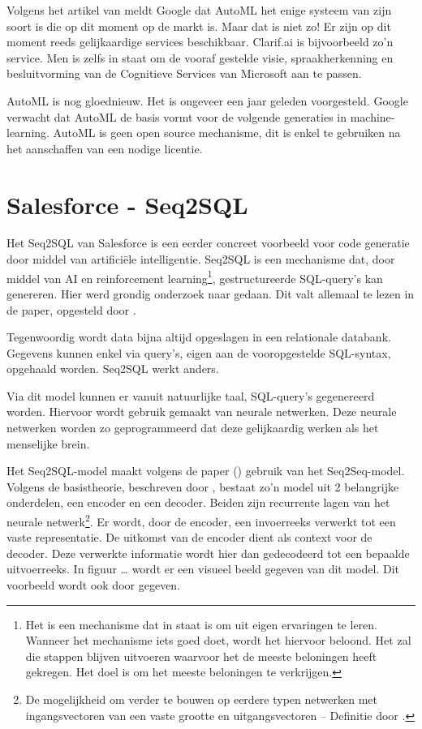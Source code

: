 Volgens het artikel van \textcite{tc} meldt Google dat AutoML het enige systeem van zijn soort is die op dit moment op de markt is. Maar dat is niet zo! Er zijn op dit moment reeds gelijkaardige services beschikbaar. Clarif.ai is bijvoorbeeld zo’n service. Men is zelfs in staat om de vooraf gestelde visie, spraakherkenning en besluitvorming van de Cognitieve Services van Microsoft aan te passen.
 
AutoML is nog gloednieuw. Het is ongeveer een jaar geleden voorgesteld. Google verwacht dat AutoML de basis vormt voor de volgende generaties in machine-learning. AutoML is geen open source mechanisme, dit is enkel te gebruiken na het aanschaffen van een nodige licentie.

\section{Salesforce - Seq2SQL}
\label{sec:Salesforce - Seq2SQL}

Het Seq2SQL van Salesforce is een eerder concreet voorbeeld voor code generatie door middel van artificiële intelligentie. Seq2SQL is een mechanisme dat, door middel van AI en reinforcement learning\footnote{Het is een mechanisme dat in staat is om uit eigen ervaringen te leren. Wanneer het mechanisme iets goed doet, wordt het hiervoor beloond. Het zal die stappen blijven uitvoeren waarvoor het de meeste beloningen heeft gekregen. Het doel is om het meeste beloningen te verkrijgen.}, gestructureerde SQL-query’s kan genereren. Hier werd grondig onderzoek naar gedaan. Dit valt allemaal te lezen in de paper, opgesteld door \textcite{seq2sqlPaper}.

Tegenwoordig wordt data bijna altijd opgeslagen in een relationale databank. Gegevens kunnen enkel via query’s, eigen aan de vooropgestelde SQL-syntax, opgehaald worden. Seq2SQL werkt anders.

Via dit model kunnen er vanuit natuurlijke taal, SQL-query’s gegenereerd worden. Hiervoor wordt gebruik gemaakt van neurale netwerken. Deze neurale netwerken worden zo geprogrammeerd dat deze gelijkaardig werken als het menselijke brein. 

Het Seq2SQL-model maakt volgens de paper (\textcite{seq2sqlPaper}) gebruik van het Seq2Seq-model. Volgens de basistheorie, beschreven door \textcite{drnn}, bestaat zo’n model uit 2 belangrijke onderdelen, een encoder en een decoder. Beiden zijn recurrente lagen van het neurale netwerk\footnote{De mogelijkheid om verder te bouwen op eerdere typen netwerken met ingangsvectoren van een vaste grootte en uitgangsvectoren – Definitie door \textcite{rnn}.}. Er wordt, door de encoder, een invoerreeks verwerkt tot een vaste representatie. De uitkomst van de encoder dient als context voor de decoder. Deze verwerkte informatie wordt hier dan gedecodeerd tot een bepaalde uitvoerreeks. In figuur … wordt er een visueel beeld gegeven van dit model. Dit voorbeeld wordt ook door \textcite{drnn} gegeven.

